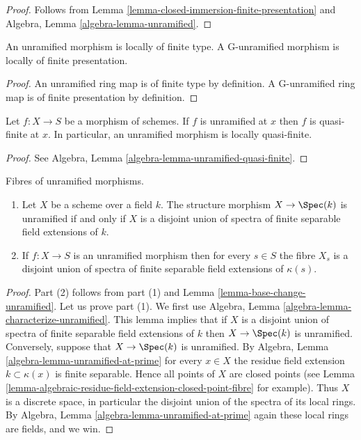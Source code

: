 \begin{proof}
Follows from Lemma \ref{lemma-closed-immersion-finite-presentation} and
Algebra, Lemma \ref{algebra-lemma-unramified}.
\end{proof}

\begin{lemma}
\label{lemma-unramified-locally-finite-type}
An unramified morphism is locally of finite type.
A G-unramified morphism is locally of finite presentation.
\end{lemma}

\begin{proof}
An unramified ring map is of finite type by definition.
A G-unramified ring map is of finite presentation by definition.
\end{proof}

\begin{lemma}
\label{lemma-unramified-quasi-finite}
Let $f : X \to S$ be a morphism of schemes.
If $f$ is unramified at $x$ then $f$ is quasi-finite at $x$.
In particular, an unramified morphism is locally quasi-finite.
\end{lemma}

\begin{proof}
See Algebra, Lemma \ref{algebra-lemma-unramified-quasi-finite}.
\end{proof}

\begin{lemma}
\label{lemma-unramified-over-field}
Fibres of unramified morphisms.
\begin{enumerate}
\item Let $X$ be a scheme over a field $k$.
The structure morphism $X \to \Spec(k)$ is unramified if
and only if $X$ is a disjoint union of spectra of finite separable
field extensions of $k$.
\item If $f : X \to S$ is an unramified morphism then for every $s \in S$
the fibre $X_s$ is a disjoint union of spectra of finite separable field
extensions of $\kappa(s)$.
\end{enumerate}
\end{lemma}

\begin{proof}
Part (2) follows from part (1) and
Lemma \ref{lemma-base-change-unramified}.
Let us prove part (1).
We first use Algebra, Lemma \ref{algebra-lemma-characterize-unramified}.
This lemma implies that if $X$ is a disjoint union of spectra of finite
separable field extensions of $k$ then $X \to \Spec(k)$ is unramified.
Conversely, suppose that $X \to \Spec(k)$ is unramified.
By Algebra, Lemma \ref{algebra-lemma-unramified-at-prime} for every $x \in X$
the residue field extension $k \subset \kappa(x)$ is
finite separable. Hence all points of $X$ are closed points (see
Lemma \ref{lemma-algebraic-residue-field-extension-closed-point-fibre}
for example). Thus $X$ is a discrete space, in particular the disjoint union
of the spectra of its local rings. By
Algebra, Lemma \ref{algebra-lemma-unramified-at-prime} again these
local rings are fields, and we win.
\end{proof}

